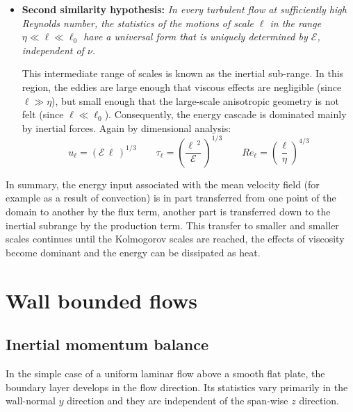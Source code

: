 \documentclass[12pt, a4paper, twoside, openright]{book}
\begin{document}
\begin{itemize}
	\item \textbf{Second similarity hypothesis:} \textit{In every turbulent flow at sufficiently high Reynolds number, the statistics of the motions of scale $\ell$ in the range $\eta \ll \ell \ll \ell_0$  have a universal form that is uniquely determined by $\mathcal{E}$, independent of $\nu$.}

	      This intermediate range of scales is known as the inertial sub-range. In this region, the eddies are large enough that viscous effects are negligible (since $\ell \gg \eta$), but small enough that the large-scale anisotropic geometry is not felt (since $\ell \ll \ell_0$). Consequently, the energy cascade is dominated mainly by inertial forces. Again by dimensional analysis:
	      \begin{equation}
		      u_{\ell} = (\mathcal{E} \, \ell \,)^{1/3} \qquad
		      \tau_{\ell} = \left( \frac{\ell \, ^2}{\mathcal{E}}  \,\right)^{1/3} \qquad
		      Re_{\ell} = \left( \frac{\ell}{\eta} \right)^{4/3}
		      \label{eq:k41-inertial-subrange}
	      \end{equation}
\end{itemize}

In summary, the energy input associated with the mean velocity field (for example as a result of convection) is in part transferred from one point of the domain to another by the flux term, another part is transferred down to the inertial subrange by the production term. This transfer to smaller and smaller scales continues until the Kolmogorov scales are reached, the effects of viscosity become dominant and the energy can be dissipated as heat.

\section{Wall bounded flows}
\label{sec:wall-bounded-flows}

\subsection{Inertial momentum balance}
In the simple case of a uniform laminar flow above a smooth flat plate, the boundary layer develops in the flow direction. Its statistics vary primarily in the wall-normal $y$ direction and they are independent of the span-wise $z$ direction.
\end{document}
